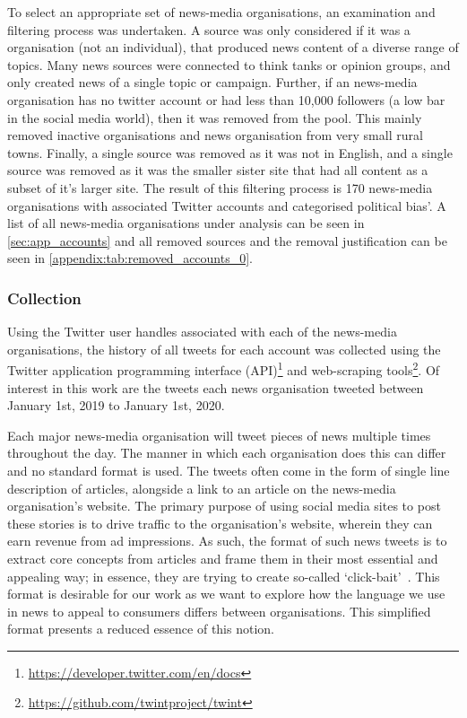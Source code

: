 To select an appropriate set of news-media organisations, an examination and filtering process was undertaken. A source was only considered if it was a organisation (not an individual), that produced news content of a diverse range of topics. Many news sources were connected to think tanks or opinion groups, and only created news of a single topic or campaign. Further, if an news-media organisation has no twitter account or had less than 10,000 followers (a low bar in the social media world), then it was removed from the pool. This mainly removed inactive organisations and news organisation from very small rural towns. 
Finally, a single source was removed as it was not in English, and a single source was removed as it was the smaller sister site that had all content as a subset of it's larger site.  The result of this filtering process is 170 news-media organisations with associated Twitter accounts and categorised political bias'.  A list of all news-media organisations under analysis can be seen in \autoref{sec:app_accounts} and all removed sources and the removal justification can be seen in \autoref{appendix:tab:removed_accounts_0}.

\subsubsection{Collection}
Using the Twitter user handles associated with each of the news-media organisations, the history of all tweets for each account was collected using the Twitter application programming interface (API)\footnote{\url{https://developer.twitter.com/en/docs}} and web-scraping tools\footnote{\url{https://github.com/twintproject/twint}}. Of interest in this work are the tweets each news organisation tweeted between January 1st, 2019 to January 1st, 2020. 

Each major news-media organisation will tweet pieces of news multiple times throughout the day. The manner in which each organisation does this can differ and no standard format is used. The tweets often come in the form of single line description of articles, alongside a link to an article on the news-media organisation's website. The primary purpose of using social media sites to post these stories is to drive traffic to the organisation's website, wherein they can earn revenue from ad impressions. As such, the format of such news tweets is to extract core concepts from articles and frame them in their most essential and appealing way; in essence, they are trying to create so-called `click-bait'~\cite{potthast_crowdsourcing_2018}. This format is desirable for our work as we want to explore how the language we use in news to appeal to consumers differs between organisations. This simplified format presents a reduced essence of this notion.

